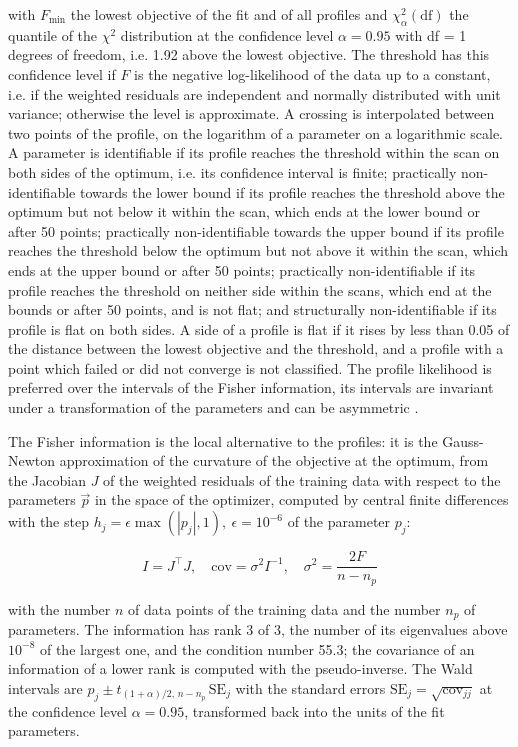 with $F_{\min}$ the lowest objective of the fit and of all profiles and $\chi^2_{\alpha}(\mathrm{df})$ the quantile of the $\chi^2$ distribution at the confidence level $\alpha = 0.95$ with df = 1 degrees of freedom, i.e. 1.92 above the lowest objective. The threshold has this confidence level if $F$ is the negative log-likelihood of the data up to a constant, i.e. if the weighted residuals are independent and normally distributed with unit variance; otherwise the level is approximate. A crossing is interpolated between two points of the profile, on the logarithm of a parameter on a logarithmic scale. A parameter is identifiable if its profile reaches the threshold within the scan on both sides of the optimum, i.e. its confidence interval is finite; practically non-identifiable towards the lower bound if its profile reaches the threshold above the optimum but not below it within the scan, which ends at the lower bound or after 50 points; practically non-identifiable towards the upper bound if its profile reaches the threshold below the optimum but not above it within the scan, which ends at the upper bound or after 50 points; practically non-identifiable if its profile reaches the threshold on neither side within the scans, which end at the bounds or after 50 points, and is not flat; and structurally non-identifiable if its profile is flat on both sides. A side of a profile is flat if it rises by less than 0.05 of the distance between the lowest objective and the threshold, and a profile with a point which failed or did not converge is not classified. The profile likelihood is preferred over the intervals of the Fisher information, its intervals are invariant under a transformation of the parameters and can be asymmetric \cite{Wieland2021}.

The Fisher information is the local alternative to the profiles: it is the Gauss-Newton approximation of the curvature of the objective at the optimum, from the Jacobian $J$ of the weighted residuals of the training data with respect to the parameters $\vec{p}$ in the space of the optimizer, computed by central finite differences with the step $h_j = \epsilon \max(|p_j|, 1),\ \epsilon = 10^{-6}$ of the parameter $p_j$:

\begin{equation}
I = J^\top J, \quad \mathrm{cov} = \sigma^2 I^{-1}, \quad \sigma^2 = \frac{2 F}{n - n_p}
\end{equation}

with the number $n$ of data points of the training data and the number $n_p$ of parameters. The information has rank 3 of 3, the number of its eigenvalues above $10^{-8}$ of the largest one, and the condition number 55.3; the covariance of an information of a lower rank is computed with the pseudo-inverse. The Wald intervals are $\hat{p}_j \pm t_{(1+\alpha)/2,\, n-n_p}\, \mathrm{SE}_j$ with the standard errors $\mathrm{SE}_j = \sqrt{\mathrm{cov}_{jj}}$ at the confidence level $\alpha = 0.95$, transformed back into the units of the fit parameters.


